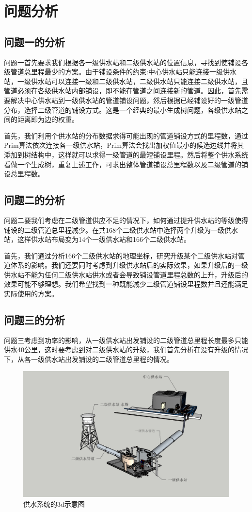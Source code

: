 \documentclass{cumcmthesis}
\begin{document}
\section{问题分析}

\subsection{问题一的分析}
问题一首先要求我们根据各一级供水站和二级供水站的位置信息，寻找到使铺设各级管道总里程最少的方案。由于铺设条件的约束:中心供水站只能连接一级供水站，一级供水站可以连接一级和二级供水站，二级供水站只能连接二级供水站，且管道必须在各级供水站内部铺设，即不能在管道之间连接新的管道。因此，首先需要解决中心供水站到一级供水站的管道铺设问题，然后根据已经铺设好的一级管道分布，选择二级管道的铺设方式。这是一个经典的最小生成树问题，各级供水站之间的距离即为边的权重。

首先，我们利用个供水站的分布数据求得可能出现的管道铺设方式的里程数，通过Prim算法依次连接各一级供水站，Prim算法会找出加权值最小的候选边线并将其添加到树结构中，这样就可以求得一级管道的最短铺设里程。然后将整个供水系统看做一个生成树，重复上述工作，可求出整体管道铺设总里程数以及二级管道的铺设总里程数。

\subsection{问题二的分析}
问题二要我们考虑在二级管道供应不足的情况下，如何通过提升供水站的等级使得铺设的二级管道总里程减少。在共168个二级供水站中选择两个升级为一级供水站，这样供水站布局变为14个一级供水站和166个二级供水站。

首先，我们通过分析166个二级供水站的地理坐标，研究升级某个二级供水站对管道体系的影响。我们还要同时考虑到升级供水站后的实际效果，如果升级后的一级供水站不能为任何二级供水站供水或者会导致铺设管道里程总数的上升，升级后的效果可能不够理想。我们希望找到一种既能减少二级管道铺设里程数并且还能满足实际使用的方案。

\subsection{问题三的分析}
问题三考虑到功率的影响，从一级供水站出发铺设的二级管道总里程长度最多只能供水40公里，这时要考虑到对二级供水站的升级，我们首先分析在没有升级的情况下，从各一级供水站出发铺设的二级管道总里程的情况。


\begin{figure}[!h]
  \centering
  \includegraphics[width=.6\textwidth]{figure/shuiguan.jpg}
  \caption{供水系统的3d示意图}
    \label{fig:circuit-diagram}
\end{figure}
\end{document}
